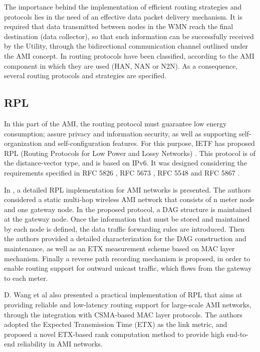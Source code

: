 \documentclass[11pt,draftclsnofoot,onecolumn]{IEEEtran}
\begin{document}
The importance behind the implementation of efficient routing strategies and protocols lies in the need of an effective data packet delivery mechanism. It is required that data transmitted between nodes in the WMN reach the final destination (data collector), so that such information can be successfully received by the Utility, through the bidirectional communication channel outlined under the AMI concept. In \cite{Sabbah2014} routing protocols have been classified, according to the AMI component in which they are used (HAN, NAN or N2N). As a consequence, several routing protocols and strategies are specified.


\subsection{RPL}\label{rpl}

In this part of the AMI, the routing protocol must guarantee low energy consumption; assure privacy and information security, as well as supporting self-organization and self-configuration features. For this purpose, IETF has proposed RPL (Routing Protocols for Low Power and Lossy Networks)  \cite{Winter2012}. This protocol is of the distance-vector type, and is based on IPv6. It was designed considering the requirements specified in RFC 5826 \cite{Brandt2010}, RFC 5673 \cite{Pister2009}, RFC 5548 \cite{Dohler2009} and RFC 5867 \cite{Martocci2010}. 

In \cite{Wang2010} , a detailed RPL implementation for AMI networks is presented. The authors considered a static multi-hop wireless AMI network that consists of n meter node and one gateway node. In the proposed protocol, a DAG structure is maintained at the gateway node. Once the information that must be stored and maintained by each node is defined, the data traffic forwarding rules are introduced. Then the authors provided a detailed characterization for the DAG construction and maintenance, as well as an ETX measurement scheme based on MAC layer mechanism. Finally a reverse path recording mechanism is proposed, in order to enable routing support for outward unicast traffic, which flows from the gateway to each meter. 

D. Wang et al \cite{Wang2010} also presented a practical implementation of RPL that aims at providing reliable and low-latency routing support for large-scale AMI networks, through the integration with CSMA-based MAC layer protocols. The authors adopted the Expected Transmission Time (ETX) as the link metric, and proposed a novel ETX-based rank computation method to provide high end-to-end reliability in AMI networks. 
\end{document}
